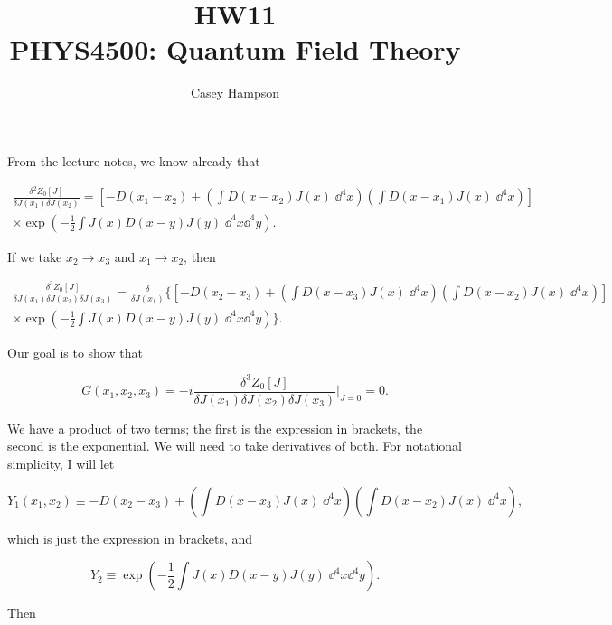 \documentclass[titlepage]{article}
\title{HW11 \\[5pt] PHYS4500: Quantum Field Theory}
\author{Casey Hampson}
\begin{document}
\maketitle
\pagebreak



From the lecture notes, we know already that

\begin{multline}
    \frac{\delta^2 Z_0[J]}{\delta J(x_1) \delta J(x_2)} = \left[ -D(x_1 - x_2) + \left( \int D(x-x_2) J(x) \;\dd^4x \right)\left( \int D(x-x_1) J(x) \;\dd^4x \right) \right] \\
    \times \exp\left( -\frac{1}{2}\int J(x) D(x-y) J(y) \;\dd^4x\dd^4y \right).
\end{multline}

If we take $x_2 \rightarrow x_3$ and $x_1 \rightarrow x_2$, then

\begin{multline}
    \frac{\delta^3 Z_0[J]}{\delta J(x_1) \delta J(x_2) \delta J(x_3)} = \frac{\delta}{\delta J(x_1)}\Bigg\{\left[ -D(x_2 - x_3) + \left( \int D(x-x_3) J(x) \;\dd^4x \right)\left( \int D(x-x_2) J(x) \;\dd^4x \right) \right] \\
    \times \exp\left( -\frac{1}{2}\int J(x) D(x-y) J(y) \;\dd^4x\dd^4y \right) \Bigg\}.
\end{multline}

Our goal is to show that

\begin{equation}
    G(x_1,x_2,x_3) = -i \frac{\delta^3 Z_0[J]}{\delta J(x_1) \delta J(x_2) \delta J(x_3)}\bigg|_{J=0} = 0.
\end{equation}

We have a product of two terms; the first is the expression in brackets, the second is the exponential. We will need to take derivatives of both. For notational simplicity, I will let

\begin{equation}
    Y_1(x_1,x_2) \equiv  -D(x_2 - x_3) + \left( \int D(x-x_3) J(x) \;\dd^4x \right)\left( \int D(x-x_2) J(x) \;\dd^4x \right),
\end{equation}

which is just the expression in brackets, and

\begin{equation}
    Y_2 \equiv \exp\left( -\frac{1}{2}\int J(x) D(x-y) J(y) \;\dd^4x\dd^4y \right).
\end{equation}

Then
\end{document}
